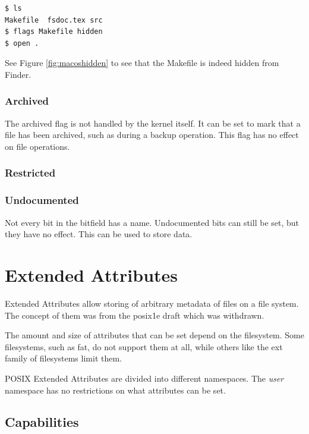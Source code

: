 \documentclass[a4paper]{article}
\begin{document}
\begin{verbatim}
$ ls
Makefile  fsdoc.tex src
$ flags Makefile hidden
$ open .
\end{verbatim}
See Figure \ref{fig:macoshidden} to see that the Makefile is indeed hidden from Finder.

\subsubsection{Archived}

The archived flag is not handled by the kernel itself. It can be set to mark that a file has been archived, such as during a backup operation. This flag has no effect on file operations.

\subsubsection{Restricted}

\subsubsection{Undocumented}

Not every bit in the bitfield has a name. Undocumented bits can still be set, but they have no effect. This can be used to store data.

\section{Extended Attributes}

Extended Attributes allow storing of arbitrary metadata of files on a file system. The concept of them was from the \gls{posix}\.1e draft which was withdrawn.



The amount and size of attributes that can be set depend on the filesystem. Some filesystems, such as \gls{fat}, do not support them at all, while others like the \gls{ext} family of filesystems limit them.

POSIX Extended Attributes are divided into different namespaces. The \emph{user} namespace has no restrictions on what attributes can be set. 

\subsection{Capabilities}
\end{document}
